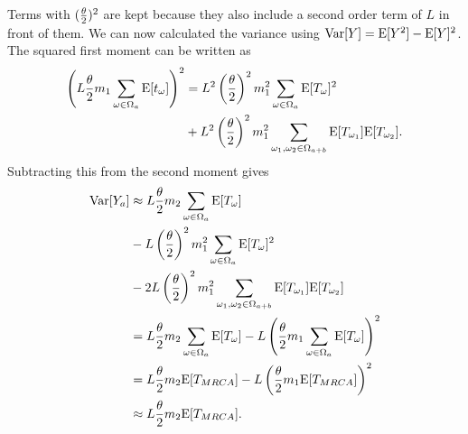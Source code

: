 Terms with $(\frac{\theta}{2})^2$ are kept because they also include a second order term of
$L$ in front of them. We can now calculated the variance using $\mathrm{Var}[Y]=\mathrm{E}[Y^2] -
\mathrm{E}[Y]^2$. The squared first moment can be written as
\begin{align}
  \left(L\frac{\theta}{2} m_1 \sum_{\omega \in \Omega_a} \mathrm{E}[t_\omega] \right)^2 &=
  L^2\left(\frac{\theta}{2}\right)^2 m_1^2 \sum_{\omega \in \Omega_a} \mathrm{E}[T_\omega]^2 \nonumber \\
  &+ L^2\left(\frac{\theta}{2}\right)^2 m_1^2 \sum_{\omega_1 , \omega_2 \in \Omega_{a+b}} \mathrm{E}[T_{\omega_1}]\mathrm{E}[T_{\omega_2}].
\end{align}
Subtracting this from the second moment gives
\begin{align}
  \label{eq:var}
  \mathrm{Var}[Y_a] &\approx L\frac{\theta}{2} m_2 \sum_{\omega \in \Omega_a} \mathrm{E}[T_\omega] \nonumber \\
  &- L \left(\frac{\theta}{2}\right)^2 m_1^2 \sum_{\omega \in \Omega_a}\mathrm{E}[T_\omega]^2 \nonumber \\
  &-  2L \left(\frac{\theta}{2}\right)^2 m_1^2 \sum_{\omega_1 , \omega_2 \in \Omega_{a+b}} \mathrm{E}[T_{\omega_1}]\mathrm{E}[T_{\omega_2}] \nonumber \\
  &= L\frac{\theta}{2} m_2 \sum_{\omega \in \Omega_a} \mathrm{E}[T_\omega] -
  L\left( \frac{\theta}{2} m_1 \sum_{\omega \in \Omega_a} \mathrm{E}[T_\omega] \right)^2 \nonumber \\
  &= L\frac{\theta}{2} m_2 \mathrm{E}[T_{MRCA}] - L\left( \frac{\theta}{2} m_1 \mathrm{E}[T_{MRCA}] \right)^2  \\
  &\approx L\frac{\theta}{2} m_2 \mathrm{E}[T_{MRCA}].  \nonumber
\end{align}

